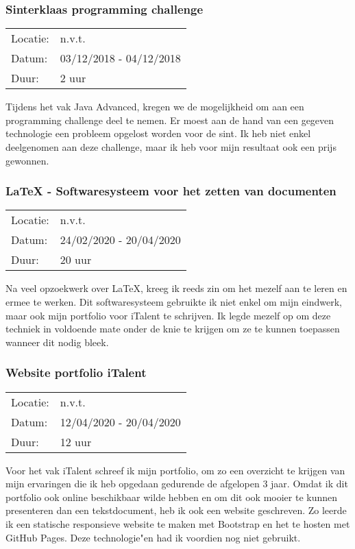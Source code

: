\subsubsection{Sinterklaas programming challenge}

\begin{tabular}{l l}
  Locatie: & n.v.t.\\
  Datum: & 03/12/2018 - 04/12/2018\\
  Duur: & 2 uur
\end{tabular}

Tijdens het vak Java Advanced, kregen we de mogelijkheid om aan een programming challenge deel te nemen. Er moest aan de hand van een gegeven technologie een probleem opgelost worden voor de sint. Ik heb niet enkel deelgenomen aan deze challenge, maar ik heb voor mijn resultaat ook een prijs gewonnen.

\subsubsection{\LaTeX{} - Softwaresysteem voor het zetten van documenten}

\begin{tabular}{l l}
  Locatie: & n.v.t.\\
  Datum: & 24/02/2020 - 20/04/2020\\
  Duur: & 20 uur
\end{tabular}

Na veel opzoekwerk over \LaTeX{}, kreeg ik reeds zin om het mezelf aan te leren en ermee te werken. Dit softwaresysteem gebruikte ik niet enkel om mijn eindwerk, maar ook mijn portfolio voor iTalent te schrijven. Ik legde mezelf op om deze techniek in voldoende mate onder de knie te krijgen om ze te kunnen toepassen wanneer dit nodig bleek.

\subsubsection{Website portfolio iTalent}

\begin{tabular}{l l}
  Locatie: & n.v.t.\\
  Datum: & 12/04/2020 - 20/04/2020\\
  Duur: & 12 uur
\end{tabular}

Voor het vak iTalent schreef ik mijn portfolio, om zo een overzicht te krijgen van mijn ervaringen die ik heb opgedaan gedurende de afgelopen 3 jaar. Omdat ik dit portfolio ook online beschikbaar wilde hebben en om dit ook mooier te kunnen presenteren dan een tekstdocument, heb ik ook een website geschreven. Zo leerde ik een statische responsieve website te maken met Bootstrap en het te hosten met GitHub Pages. Deze technologie"en had ik voordien nog niet gebruikt.